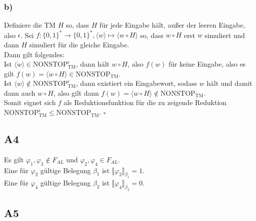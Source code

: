 \documentclass[12pt, a4paper]{article}
\newcommand*{\qed}{\null\nobreak\hfill\ensuremath{\square}}
\newcommand{\STOPe}{\text{NONSTOP}_\text{TM}^\epsilon}
\newcommand{\STOP}{\text{NONSTOP}_\text{TM}}
\begin{document}
\subsubsection*{b)}
Definiere die TM \(H\) so, dass \(H\) für jede Eingabe hält, außer der leeren Eingabe, also \(\epsilon\). Sei \(f : \{0,1\}^* \rightarrow \{0,1\}^*, \langle w \rangle \mapsto \langle w \circ H \rangle\) so, dass \(w \circ H\) erst \(w\) simuliert und dann \(H\) simuliert für die gleiche Eingabe. \\
Dann gilt folgendes: \\
Ist \(\langle w\rangle \in \STOPe\), dann hält \(w \circ H\), also \(f(w)\)  für keine Eingabe, also es gilt \(f(w) = \langle w \circ H \rangle \in \STOP\). \\
Ist \(\langle w\rangle \not\in \STOPe\), dann existiert ein Eingabewort, sodass \(w\) hält und damit dann auch \(w \circ H\), also gilt dann \(f(w) = \langle w \circ H \rangle \not\in \STOP\). \\
Somit eignet sich \(f\) als Reduktionsfunktion für die zu zeigende Reduktion \(\STOPe \le \STOP\). \qed

\subsection*{A4}
Es gilt \(\varphi_1, \varphi_3 \notin F_{AL}\) und \(\varphi_2, \varphi_4 \in F_{AL}\).\\
Eine für \(\varphi_2\) gültige Belegung \(\beta_1\) ist \(\llbracket \varphi_2 \rrbracket_{\beta_1} = 1\).\\
Eine für \(\varphi_4\) gültige Belegung \(\beta_2\) ist \(\llbracket \varphi_4 \rrbracket_{\beta_2} = 0\).

\subsection*{A5}
\end{document}
